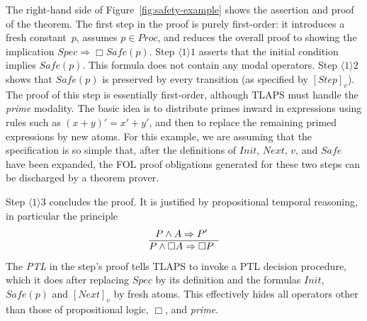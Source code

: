 \documentclass{easychair}
\renewcommand{\implies}{\Rightarrow}
\newcommand{\ps}[2]{\ensuremath{\langle #1 \rangle #2}}
\newcommand{\edmargin}[2]{\marginpar{\raggedright\footnotesize\color{red}#1: #2}}
\newcommand{\edmargin}[2]{}
\def\llmargin{\edmargin{LL}}
\def\smmargin{\edmargin{SM}}
\begin{document}
The right-hand side of Figure~\ref{fig:safety-example} shows the
assertion and proof of the theorem.
%
The first step in the proof is purely first-order: it introduces a fresh
constant~$p$, assumes \mbox{$p \in Proc$}, and reduces the overall proof to showing the
implication $Spec \implies \Box Safe(p)$. Step $\ps{1}{1}$ asserts that the
initial condition implies $Safe(p)$. This formula does not contain any modal
operators.
%
%
Step $\ps{1}{2}$ shows that $Safe(p)$ is preserved by every transition
(as specified by $[Step]_v$).
The proof of this step is essentially first-order, although TLAPS must
handle the \emph{prime} modality.  The basic idea is to distribute
primes
inward in expressions using rules such as $(x+y)' = x'+y'$,
and then to replace the remaining primed expressions by new atoms.
For this example, we are
assuming that the specification is so simple that, after the
definitions of $Init$, $Next$, $v$, and $Safe$ have been expanded, the
FOL proof obligations generated for these two steps can be discharged
by a theorem prover.


Step $\ps{1}{3}$ concludes the proof.
It is justified by propositional temporal reasoning, in particular the principle
\[
  \begin{array}{@{}c}
    P \land A \implies P'\\
    \hline
    P \land \Box A \implies \Box P
  \end{array}
 \]
The \emph{PTL} in the step's proof tells TLAPS to invoke a PTL
decision procedure, which it does after replacing $Spec$ by its
definition and the formulas $Init$, $Safe(p)$ and $[Next]_v$ by fresh
atoms.  This effectively hides all operators other than those of
propositional logic, $\Box$, and \emph{prime}.
\end{document}
